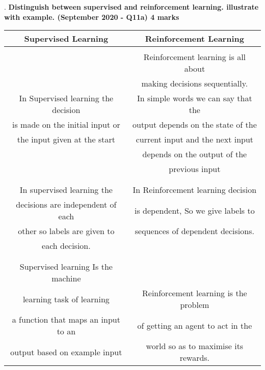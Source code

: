 .
\textbf{\textcolor{LightMagenta}{Distinguish between supervised and reinforcement learning. illustrate with example. (September 2020 - Q11a) \hfill 4 marks}} \\[5pt]


 \begin{tabular}{| c | c |} 
 \hline
 \textbf{Supervised Learning} & \textbf{Reinforcement Learning}  \\ [0.5ex] 
 \hline
                                     &                                      \\
                                     &  Reinforcement learning is all about \\
                                     &  making decisions sequentially. \\ 
 In Supervised learning the decision &  In simple words we can say that the \\
is made on the initial input or      &  output depends on the state of the \\
the input given at the start         &  current input and the next input \\
                                     &  depends on the output of the  \\
                                     &  previous input \\
                                     &                                      \\
 \hline
                                     &   \\
 In supervised learning the          & In Reinforcement learning decision \\
 decisions are independent of each   & is dependent, So we give labels to \\
 other so labels are given to        & sequences of dependent decisions.  \\
 each decision.                      & \\
                                     & \\
 \hline
                                     &      \\
 Supervised learning Is the machine  &      \\
 learning task of learning           & Reinforcement learning is the problem\\
 a function that maps an input to an & of getting an agent to act in the \\
 output based on example input       & world so as to maximise its rewards. \\

\end{tabular}
